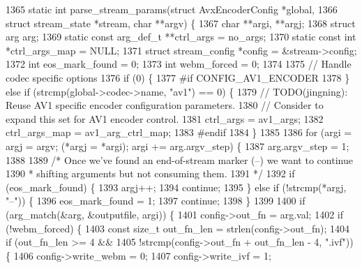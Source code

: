 \begin{DoxyCodeInclude}
{{{{{{{{{{{{{{{{1365 \textcolor{keyword}{static} \textcolor{keywordtype}{int} parse\_stream\_params(\textcolor{keyword}{struct} AvxEncoderConfig *global,
1366                                \textcolor{keyword}{struct} stream\_state *stream, \textcolor{keywordtype}{char} **argv) \{
1367   \textcolor{keywordtype}{char} **argi, **argj;
1368   \textcolor{keyword}{struct }arg arg;
1369   \textcolor{keyword}{static} \textcolor{keyword}{const} arg\_def\_t **ctrl\_args = no\_args;
1370   \textcolor{keyword}{static} \textcolor{keyword}{const} \textcolor{keywordtype}{int} *ctrl\_args\_map = NULL;
1371   \textcolor{keyword}{struct }stream\_config *config = &stream->config;
1372   \textcolor{keywordtype}{int} eos\_mark\_found = 0;
1373   \textcolor{keywordtype}{int} webm\_forced = 0;
1374 
1375   \textcolor{comment}{// Handle codec specific options}
1376   \textcolor{keywordflow}{if} (0) \{
1377 \textcolor{preprocessor}{#if CONFIG\_AV1\_ENCODER}
1378   \} \textcolor{keywordflow}{else} \textcolor{keywordflow}{if} (strcmp(global->codec->name, \textcolor{stringliteral}{"av1"}) == 0) \{
1379     \textcolor{comment}{// TODO(jingning): Reuse AV1 specific encoder configuration parameters.}
1380     \textcolor{comment}{// Consider to expand this set for AV1 encoder control.}
1381     ctrl\_args = av1\_args;
1382     ctrl\_args\_map = av1\_arg\_ctrl\_map;
1383 \textcolor{preprocessor}{#endif}
1384   \}
1385 
1386   \textcolor{keywordflow}{for} (argi = argj = argv; (*argj = *argi); argi += arg.argv\_step) \{
1387     arg.argv\_step = 1;
1388 
1389     \textcolor{comment}{/* Once we've found an end-of-stream marker (--) we want to continue}
1390 \textcolor{comment}{     * shifting arguments but not consuming them.}
1391 \textcolor{comment}{     */}
1392     \textcolor{keywordflow}{if} (eos\_mark\_found) \{
1393       argj++;
1394       \textcolor{keywordflow}{continue};
1395     \} \textcolor{keywordflow}{else} \textcolor{keywordflow}{if} (!strcmp(*argj, \textcolor{stringliteral}{"--"})) \{
1396       eos\_mark\_found = 1;
1397       \textcolor{keywordflow}{continue};
1398     \}
1399 
1400     \textcolor{keywordflow}{if} (arg\_match(&arg, &outputfile, argi)) \{
1401       config->out\_fn = arg.val;
1402       \textcolor{keywordflow}{if} (!webm\_forced) \{
1403         \textcolor{keyword}{const} \textcolor{keywordtype}{size\_t} out\_fn\_len = strlen(config->out\_fn);
1404         \textcolor{keywordflow}{if} (out\_fn\_len >= 4 &&
1405             !strcmp(config->out\_fn + out\_fn\_len - 4, \textcolor{stringliteral}{".ivf"})) \{
1406           config->write\_webm = 0;
1407           config->write\_ivf = 1;
}}}}}}}}}}}}}}}}
\end{DoxyCodeInclude}
